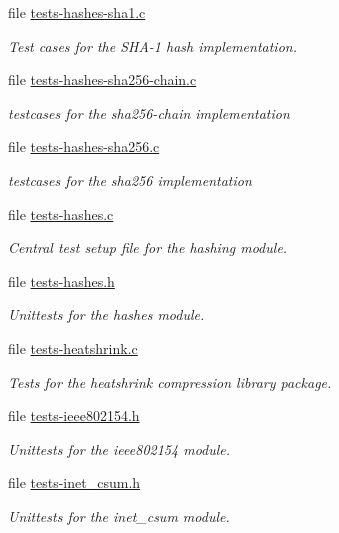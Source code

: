 \begin{DoxyCompactItemize}
file \hyperlink{tests-hashes-sha1_8c}{tests-\/hashes-\/sha1.\+c}
\begin{DoxyCompactList}\small\item\em Test cases for the S\+H\+A-\/1 hash implementation. \end{DoxyCompactList}\item 
file \hyperlink{tests-hashes-sha256-chain_8c}{tests-\/hashes-\/sha256-\/chain.\+c}
\begin{DoxyCompactList}\small\item\em testcases for the sha256-\/chain implementation \end{DoxyCompactList}\item 
file \hyperlink{tests-hashes-sha256_8c}{tests-\/hashes-\/sha256.\+c}
\begin{DoxyCompactList}\small\item\em testcases for the sha256 implementation \end{DoxyCompactList}\item 
file \hyperlink{tests-hashes_8c}{tests-\/hashes.\+c}
\begin{DoxyCompactList}\small\item\em Central test setup file for the hashing module. \end{DoxyCompactList}\item 
file \hyperlink{tests-hashes_8h}{tests-\/hashes.\+h}
\begin{DoxyCompactList}\small\item\em Unittests for the {\ttfamily hashes} module. \end{DoxyCompactList}\item 
file \hyperlink{tests-heatshrink_8c}{tests-\/heatshrink.\+c}
\begin{DoxyCompactList}\small\item\em Tests for the heatshrink compression library package. \end{DoxyCompactList}\item 
file \hyperlink{tests-ieee802154_8h}{tests-\/ieee802154.\+h}
\begin{DoxyCompactList}\small\item\em Unittests for the {\ttfamily ieee802154} module. \end{DoxyCompactList}\item 
file \hyperlink{tests-inet__csum_8h}{tests-\/inet\+\_\+csum.\+h}
\begin{DoxyCompactList}\small\item\em Unittests for the {\ttfamily inet\+\_\+csum} module. \end{DoxyCompactList}\item 

\end{DoxyCompactItemize}
